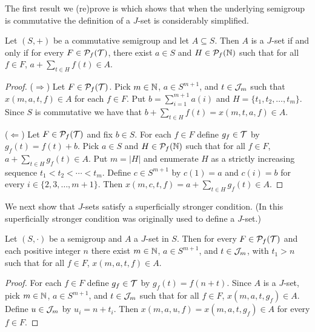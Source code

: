 The first result we (re)prove is \cite[Lemma 2.4]{Hindman:2010fk} which shows that when the underlying semigroup is commutative the definition of a $J$-set is considerably simplified. 

\begin{lem}
  \label{lem:comm-jsets}
  Let $(S, +)$ be a commutative semigroup and let $A \subseteq S$. 
  Then $A$ is a $J$-set if and only if for every $F \in \mathcal{P}_f(\mathcal{T})$, there exist $a \in S$ and $H \in \mathcal{P}_f(\mathbb{N})$ such that for all $f \in F$, $a + \sum_{t \in H} f(t) \in A$.
\end{lem}
\begin{proof}
  ($\Rightarrow$)
  Let $F \in \mathcal{P}_f(\mathcal{T})$.
  Pick $m \in \mathbb{N}$, $a \in S^{m+1}$, and $t \in \mathcal{J}_m$ such that $x(m, a, t, f) \in A$ for each $f \in F$.
  Put $b = \sum_{i=1}^{m+1} a(i)$ and $H = \{t_1, t_2, \ldots, t_m\}$.
  Since $S$ is commutative we have that $b + \sum_{t \in H} f(t) = x(m, t, a, f) \in A$.

  ($\Leftarrow$)
  Let $F \in \mathcal{P}_f(\mathcal{T})$ and fix $b \in S$.
  For each $f \in F$ define $g_f \in \mathcal{T}$ by $g_f(t) = f(t)+b$. 
  Pick $a \in S$ and $H \in \mathcal{P}_f(\mathbb{N})$ such that for all $f \in F$, $a + \sum_{t \in H} g_f(t) \in A$. 
  Put $m = |H|$ and enumerate $H$ as a strictly increasing sequence $t_1 < t_2 < \cdots < t_m$. 
  Define $c \in S^{m+1}$ by $c(1) = a$ and $c(i) = b$ for every $i \in \{2, 3, \ldots, m+1\}$.
  Then $x(m, c, t, f) = a + \sum_{t \in H} g_f(t) \in A$.
\end{proof}

We next show that $J$-sets satisfy a superficially stronger condition.
(In \cite[Definition 3.3(e)]{De:2008uq} this superficially stronger condition was originally used to define a $J$-set.)

\begin{lem}
  \label{lem:jset-start}
  Let $(S, \cdot)$ be a semigroup and $A$ a $J$-set in $S$.
  Then for every $F \in \mathcal{P}_f(\mathcal{T})$ and each positive integer $n$ there exist $m \in \mathbb{N}$, $a \in S^{m+1}$, and $t \in \mathcal{J}_m$, with $t_1 > n$ such that for all $f \in F$, $x(m, a, t, f) \in A$.
\end{lem}
\begin{proof}
  For each $f \in F$ define $g_f \in \mathcal{T}$ by $g_f(t) = f(n+t)$.
  Since $A$ is a $J$-set, pick $m \in \mathbb{N}$, $a \in S^{m+1}$, and $t \in \mathcal{J}_m$ such that for all $f \in F$, $x(m, a, t, g_f) \in A$. 
  Define $u \in \mathcal{J}_m$ by $u_i =  n + t_i$.
  Then $x(m, a, u, f) = x(m, a, t, g_f) \in A$ for every $f \in F$.
\end{proof}

